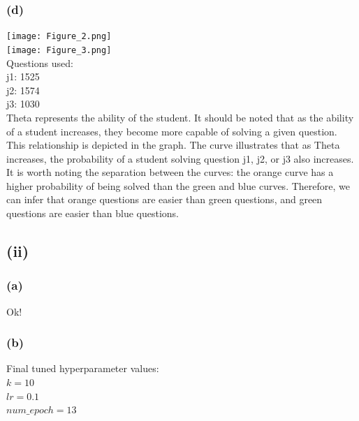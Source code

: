 \documentclass{article}
\begin{document}
\subsubsection{(d)}
\texttt{[image: Figure\_2.png]}\\
\texttt{[image: Figure\_3.png]}\\
Questions used:\\
j1: 1525\\
j2: 1574\\
j3: 1030\\
Theta represents the ability of the student. It should be noted that as the ability of a student increases, they become more capable of solving a given question. This relationship is depicted in the graph. The curve illustrates that as Theta increases, the probability of a student solving question j1, j2, or j3 also increases. It is worth noting the separation between the curves: the orange curve has a higher probability of being solved than the green and blue curves. Therefore, we can infer that orange questions are easier than green questions, and green questions are easier than blue questions.



\subsection{(ii)}
\subsubsection{(a)}
Ok!
\subsubsection{(b)}
Final tuned hyperparameter values:\\
$k = 10$\\
$lr = 0.1$\\
$num\_epoch = 13$
\end{document}
